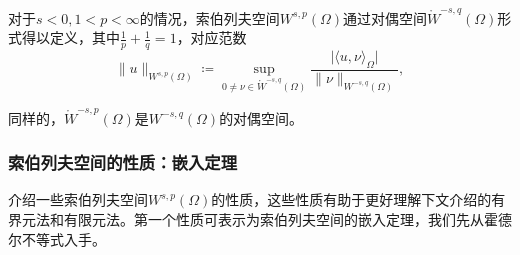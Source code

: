 对于$s < 0, 1<p<\infty$的情况，索伯列夫空间$W^{s,p}(\Omega)$通过对偶空间$\mathring{W}^{-s,q}(\Omega)$形式得以定义，其中$\frac{1}{p} + \frac{1}{q} = 1$，对应范数
\begin{equation*}
  \| u \| _{W^{s,p}(\Omega)} \coloneqq \sup_{0 \neq \nu \in \mathring{W}^{-s,q}(\Omega)} \frac{
  \big| \langle u,\nu \rangle_{\Omega} \big|
  }{
  \| \nu \|_{W^{-s,q}(\Omega)}
  },
\end{equation*}

同样的，$\mathring{W}^{-s,p}(\Omega)$是$W^{-s,q}(\Omega)$的对偶空间。

\subsubsection{索伯列夫空间的性质：嵌入定理}
\label{sec:imbedding-sobolev}
介绍一些索伯列夫空间$W^{s,p}(\Omega)$的性质，这些性质有助于更好理解下文介绍的有界元法和有限元法。第一个性质可表示为索伯列夫空间的嵌入定理，我们先从霍德尔不等式入手。

